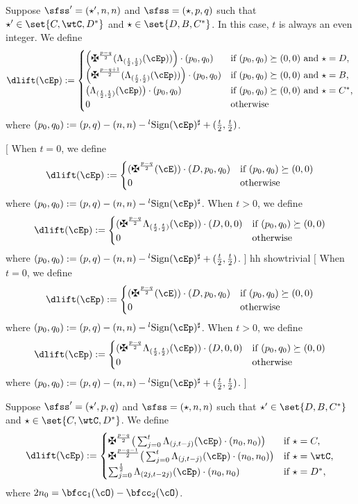 \documentclass[12pt,a4paper]{amsart}
\newcommand{\trivial}[2][]{\if\relax\detokenize{#1}\relax
  {%
      \color{orange} \vspace{0em} $[$  #2 $]$
      \color{black}
  }
  \else
\ifx#1h
\ifcsname showtrivial\endcsname
{%
    \color{orange} \vspace{0em}  $[$ #2 $]$
    \color{black}
}
\fi
\else {\red Wrong argument!} \fi
\fi
}
\numberwithin{equation}{section}
\theoremstyle{remark}
\def\lsign{{}^l\mathrm{Sign}}
\begin{document}
\medskip

Suppose $\sfss'=(\star',n,n)$ and $\sfss =(\star,p,q)$ such that
$\star'\in \set{ C,\wtC, D^{*}}$  and $\star \in \set{D,B, C^{*}}$.
In this case, $t$ is always an even integer. We define
\begin{equation}\label{eq:LCD}
  \dlift(\cEp) :=
  \begin{cases}
    \left(\maltese^{\frac{p-q}{2}}(\Lambda_{(\frac{t}{2},\frac{t}{2})}( \cEp))\right)\cdot (p_{0},q_{0}) &
    \text{if } ( p_{0},q_{0} ) \succeq (0,0) \text{ and } \star=D, \\
    \left(\maltese^{\frac{p-q+1}{2}}(\Lambda_{(\frac{t}{2},\frac{t}{2})}( \cEp))\right)\cdot (p_{0},q_{0}) &
    \text{if } ( p_{0},q_{0} ) \succeq (0,0) \text{ and } \star=B, \\
    \big(\Lambda_{(\frac{t}{2},\frac{t}{2})}( \cEp)\big)\cdot (p_{0},q_{0}) &
    \text{if } ( p_{0},q_{0} ) \succeq (0,0) \text{ and } \star=C^{*}, \\
    0 & \text{otherwise}
  \end{cases}
\end{equation}
where $(p_{0}, q_{0})  := (p,q) -(n,n)-\lsign(\cEp)^{\sharp} + (\frac{t}{2},\frac{t}{2})$.

\trivial[h]{
When $t=0$, we define
\[
  \dlift(\cEp) :=
  \begin{cases}
    (\maltese^{\frac{p-q}{2}}(\cE))\cdot (D,p_{0},q_{0}) &
    \text{if } ( p_{0},q_{0} ) \succeq (0,0) \\
    0 & \text{otherwise}
  \end{cases}
\]
where $(p_{0}, q_{0})  := (p,q) -(n,n)-\lsign(\cEp)^{\sharp} $.
When $t>0$, we define
\[
  \dlift(\cEp) :=
  \begin{cases}
    (\maltese^{\frac{p-q}{2}}\Lambda_{(\frac{t}{2},\frac{t}{2})}(\cEp)) \cdot (D,0,0) &
    \text{if } ( p_{0},q_{0} ) \succeq (0,0) \\
    0 & \text{otherwise}
  \end{cases}
\]
where $(p_{0}, q_{0})  := (p,q) -(n,n)-\lsign(\cEp)^{\sharp} + (\frac{t}{2},\frac{t}{2})$.
}

\medskip

Suppose $\sfss' =(\star',p,q)$ and $\sfss=(\star,n,n)$ such that
$\star' \in \set{ D,B,C^{*}}$  and $\star \in \set{C,\wtC,D^{*}}$.
We define
\begin{equation}\label{eq:LDC}
  \dlift(\cEp) :=
  \begin{cases}
    \maltese^{\frac{p-q}{2}}\big(\sum_{j=0}^{t} \Lambda_{(j,t-j)}( \cEp)\cdot (n_{0},n_{0})\big) & \text{if
    } \star = C,\\
    \maltese^{\frac{p-q-1}{2}}\big(\sum_{j=0}^{t} \Lambda_{(j,t-j)}( \cEp)\cdot (n_{0},n_{0})\big) & \text{if
    } \star = \wtC,\\
    \sum_{j=0}^{\frac{t}{2}} \Lambda_{(2j,t-2j)}( \cEp)\cdot (n_{0},n_{0}) & \text{if
    } \star = D^{*},
  \end{cases}
\end{equation}
where $2n_{0} = \bfcc_{1}(\cO)-\bfcc_{2}(\cO)$.
\end{document}

